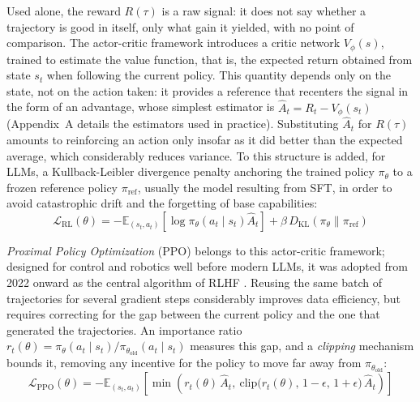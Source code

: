 \documentclass[11pt,a4paper]{article}
\begin{document}
Used alone, the reward $R(\tau)$ is a raw signal: it does not say whether a trajectory is good in itself, only what gain it yielded, with no point of comparison. The actor-critic framework introduces a critic network $V_\phi(s)$, trained to estimate the value function, that is, the expected return obtained from state $s_t$ when following the current policy. This quantity depends only on the state, not on the action taken: it provides a reference that recenters the signal in the form of an advantage, whose simplest estimator is $\hat{A}_t = R_t - V_\phi(s_t)$ (Appendix~A details the estimators used in practice). Substituting $\hat{A}_t$ for $R(\tau)$ amounts to reinforcing an action only insofar as it did better than the expected average, which considerably reduces variance. To this structure is added, for LLMs, a Kullback-Leibler divergence penalty anchoring the trained policy $\pi_\theta$ to a frozen reference policy $\pi_{\text{ref}}$, usually the model resulting from SFT, in order to avoid catastrophic drift and the forgetting of base capabilities:
\begin{equation}
\mathcal{L}_{\text{RL}}(\theta) = -\mathbb{E}_{(s_t, a_t)} \left[ \log \pi_\theta(a_t \mid s_t) \hat{A}_t \right] + \beta \, D_{\text{KL}}(\pi_\theta \parallel \pi_{\text{ref}})
\end{equation}

\emph{Proximal Policy Optimization} (PPO) \cite{schulman2017proximal} belongs to this actor-critic framework; designed for control and robotics well before modern LLMs, it was adopted from 2022 onward as the central algorithm of RLHF \cite{ouyang2022training}. Reusing the same batch of trajectories for several gradient steps considerably improves data efficiency, but requires correcting for the gap between the current policy and the one that generated the trajectories. An importance ratio $r_t(\theta) = \pi_\theta(a_t \mid s_t) / \pi_{\theta_{\text{old}}}(a_t \mid s_t)$ measures this gap, and a \emph{clipping} mechanism bounds it, removing any incentive for the policy to move far away from $\pi_{\theta_{\text{old}}}$:
\begin{equation}
\mathcal{L}_{\text{PPO}}(\theta) = -\mathbb{E}_{(s_t, a_t)} \left[ \min\left( r_t(\theta)\, \hat{A}_t, \ \text{clip}\big(r_t(\theta),\, 1-\epsilon,\, 1+\epsilon\big)\, \hat{A}_t \right) \right]
\end{equation}
\end{document}
